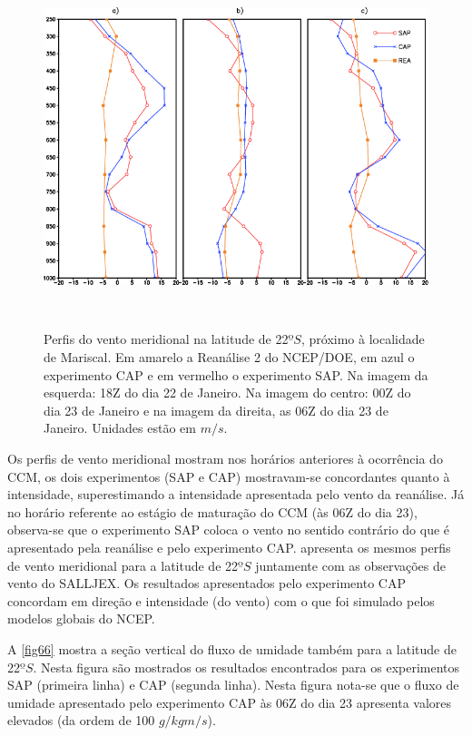\begin{figure}[!hpb]
\centering
\includegraphics[height=10.5cm]{./figs/perf_vert_vento.png}
\caption{Perfis do vento meridional na latitude de 22$ºS$, próximo à localidade de Mariscal. Em amarelo a Reanálise 2 do NCEP/DOE, em azul o experimento CAP e em vermelho o experimento SAP. Na imagem da esquerda: 18Z do dia 22 de Janeiro. Na imagem do centro: 00Z do dia 23 de Janeiro e na imagem da direita, as 06Z do dia 23 de Janeiro. Unidades estão em $m/s$.}
\label{fig65}
\end{figure}

Os perfis de vento meridional mostram nos horários anteriores à ocorrência do CCM, os dois experimentos (SAP e CAP) mostravam-se concordantes quanto à intensidade, superestimando a intensidade apresentada pelo vento da reanálise. Já no horário referente ao estágio de maturação do CCM (às 06Z do dia 23), observa-se que o experimento SAP coloca o vento no sentido contrário do que é apresentado pela reanálise e pelo experimento CAP.  apresenta os mesmos perfis de vento meridional para a latitude de 22$ºS$ juntamente com as observações de vento do SALLJEX. Os resultados apresentados pelo experimento CAP concordam em direção e intensidade (do vento) com o que foi simulado pelos modelos globais do NCEP.

A \autoref{fig66} mostra a seção vertical do fluxo de umidade também para a latitude de 22$ºS$. Nesta figura são mostrados os resultados encontrados para os experimentos SAP (primeira linha) e CAP (segunda linha). Nesta figura nota-se que o fluxo de umidade apresentado pelo experimento CAP às 06Z do dia 23 apresenta valores elevados (da ordem de 100 $g/kg m/s$).

